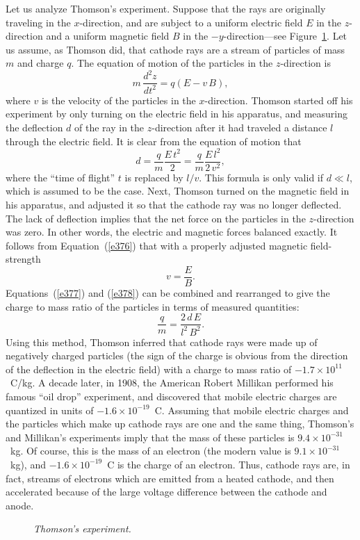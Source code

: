 Let us analyze  Thomson's experiment.  Suppose that
the rays are originally traveling in the $x$-direction, and are subject to
a uniform electric field $E$ in the   $z$-direction and a uniform magnetic
field $B$ in the $-y$-direction---see Figure~\ref{fthom}. Let us assume, as Thomson did, that cathode
rays are a stream of particles of mass $m$ and charge $q$. The
equation of motion of the particles in the $z$-direction is
\begin{equation}
m \,\frac{d^2 z}{dt^2} = q\left(E - v \,B\right),\label{e376}
\end{equation}
where $v$ is the velocity of the particles in the $x$-direction.
Thomson started off his experiment by
only turning on the  electric field in his apparatus, and
measuring the
deflection $d$ of the ray in the $z$-direction after it had traveled a
distance  $l$ through the electric field. It is clear from the equation
of motion that 
\begin{equation}\label{e377}
d = \frac{q}{m} \frac{E\,t^2}{2} = \frac{q}{m} \frac{E\,l^2}{2\,v^2},
\end{equation}
where the ``time of flight'' $t$ is replaced by $l/v$. This formula is only
valid if $d\ll l$, which is assumed to be the case. 
Next, Thomson  turned on
the magnetic field in his apparatus, and adjusted it so that the cathode ray was
no longer deflected. The lack of deflection implies that the net force on the
particles in the $z$-direction was zero. In other words, the electric and
magnetic forces balanced exactly. It follows from Equation~(\ref{e376})
that with a properly adjusted magnetic field-strength
\begin{equation}\label{e378}
v = \frac{E}{B}.
\end{equation}
Equations~(\ref{e377}) and (\ref{e378})
  can be combined and rearranged to give the charge to mass ratio of
the particles in terms of measured quantities:
\begin{equation}
\frac{q}{m} = \frac{2\,d\, E}{l^2 \,B^2}.
\end{equation}
Using this method, Thomson inferred that cathode rays were made up of
negatively charged particles (the sign of the charge is obvious from the
direction of the deflection in the electric field) with a charge to mass
ratio of $-1.7\times 10^{11}$~C/kg. A decade later, in 1908, the American Robert
Millikan performed his famous ``oil drop'' experiment, and discovered that
mobile electric charges are quantized in units of $-1.6\times 10^{-19}$~C. 
Assuming that mobile electric charges and the particles which
make up cathode rays are one and the same thing,
 Thomson's and Millikan's experiments imply that the mass
of  these particles is  $9.4\times 10^{-31}$~kg. Of course, this is the mass of
an electron (the modern value is $9.1\times 10^{-31}$~kg), and  
$-1.6\times 10^{-19}$~C is the charge of an electron. Thus, cathode rays are, in fact,
streams of electrons which are  emitted from a heated cathode, and then
accelerated because of  the large voltage difference between the cathode and anode.
\begin{figure}
\epsfysize=2.5in
\centerline{}
\caption{\em Thomson's experiment.}\label{fthom}
\end{figure}

